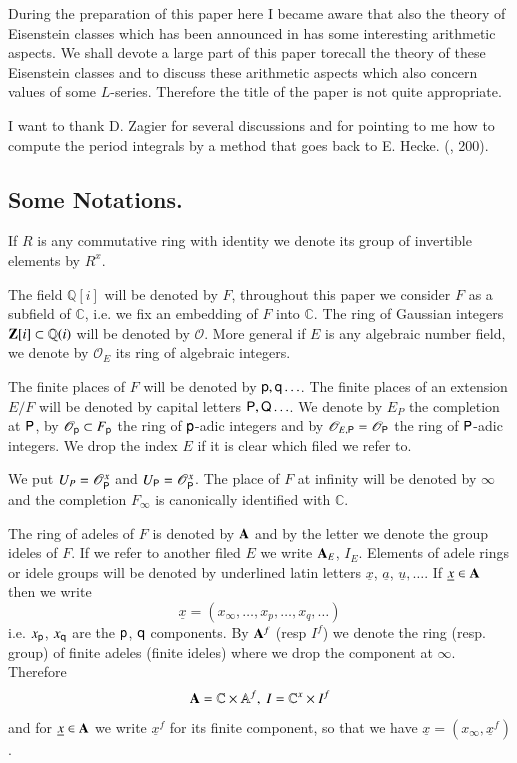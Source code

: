 During the preparation of this paper here I became aware that also the theory of Eisenstein classes which has been announced in \cite{art2-key7} has some interesting arithmetic aspects. We shall devote a large part of this paper to\pageoriginale recall the theory of these Eisenstein classes and to discuss these arithmetic aspects which also concern values of some $L$-series. Therefore the title of the paper is not quite appropriate.

I want to thank D. Zagier for several discussions and for pointing to me how to compute the period integrals by a method that goes back to E. Hecke. (\cite{art2-key10}, 200).

\setcounter{section}{1}
\setcounter{subsection}{-1}
\subsection{Some Notations.}\label{art2-sec1.0}
If $R$ is any commutative ring with identity we denote its group of invertible elements by $R^{x}$.

The field $\mathbb{Q}[i]$ will be denoted by $F$, throughout this paper we consider $F$ as a subfield of $\mathbb{C}$, i.e. we fix an embedding of $F$ into $\mathbb{C}$. The ring of Gaussian integers $\mathbf{Z}[i]\subset \mathbb{Q}(i)$ will be denoted by $\mathscr{O}$. More general if $E$ is any algebraic number field, we denote by $\mathscr{O}_{E}$ its ring of algebraic integers.

The finite places of $F$ will be denoted by $\mathsf{p},\mathsf{q}\ldots$. The finite places of an extension $E/F$ will be denoted by capital letters $\mathsf{P},\mathsf{Q}\ldots$. We denote by $E_{P}$ the completion at $\mathsf{P}$, by $\mathscr{O}_{\mathsf{p}}\subset F_{\mathsf{p}}$ the ring of $\mathsf{p}$-adic integers and by $\mathscr{O}_{E,\mathsf{P}}=\mathscr{O}_{\mathsf{P}}$ the ring of $\mathsf{P}$-adic integers. We drop the index $E$ if it is clear which filed we refer to.

We put $U_{P}=\mathscr{O}^{x}_{\mathsf{P}}$ and $U_{\mathsf{P}}=\mathscr{O}^{x}_{\mathsf{P}}$. The place of $F$ at infinity will be denoted by $\infty$ and the completion $F_{\infty}$ is canonically identified with $\mathbb{C}$.

The ring of adeles of $F$ is denoted by $\mathbf{A}$ and by the letter we denote the group ideles of $F$. If we refer to another filed $E$ we write $\mathbf{A}_{E}$, $I_{E}$. Elements of adele rings or idele groups will be denoted by underlined latin letters $\underline{x}$, $\underline{a}$, $\underline{u},\ldots$. If $\underline{x}\in \mathbf{A}$ then we write
$$
\underline{x}=(x_{\infty},\ldots,x_{p},\ldots,x_{q},\ldots)
$$
i.e. $x_{\mathsf{p}}$, $x_{\mathsf{q}}$ are the $\mathsf{p}$, $\mathsf{q}$ components. By $\mathbf{A}^{f}$ (resp $I^{f}$) we denote the ring (resp. group) of finite adeles (finite ideles) where we drop the component at $\infty$. Therefore
$$
\mathbf{A}=\mathbb{C}\times \mathbb{A}^{f}, \ I=\mathbb{C}^{x}\times I^{f}
$$
and for $\underline{x}\in \mathbf{A}$ we write $\underline{x}^{f}$ for its finite component, so that we have $\underline{x}=(x_{\infty},\underline{x}^{f})$.

